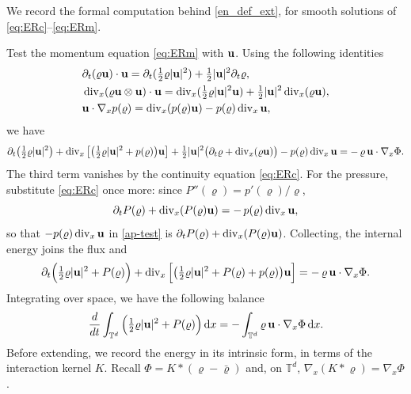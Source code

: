 \documentclass[12pt,a4paper,twoside]{article}
\newcommand{\vr}{\varrho}
\newcommand{\vu}{\vc{u}}
\newcommand{\vc}[1]{{\bf #1}}
\newcommand{\Grad}{\nabla}
\newcommand{\dx}{{\,\rm d} {x}}
\numberwithin{equation}{section}%
\newcommand{\Gradx}{\nabla_x}
\newcommand{\Divx}{\operatorname{div}_x}
\begin{document}
We record the formal computation behind \eqref{en_def_ext}, for smooth solutions of \eqref{eq:ERc}--\eqref{eq:ERm}. %

Test the momentum equation \eqref{eq:ERm} with $\vu$. 
Using the following identities 
\begin{align*}
	&\partial_t(\vr\vu)\cdot\vu = \partial_t(\tfrac12\vr|\vu|^2) + \tfrac12|\vu|^2\partial_t\vr,\\ 
	&\Divx(\vr\vu\otimes\vu)\cdot\vu = \Divx(\tfrac12\vr|\vu|^2\vu) + \tfrac12|\vu|^2\Divx(\vr\vu), \\
	&\vu\cdot\Gradx p(\vr)=\Divx(p(\vr)\vu)-p(\vr)\Divx\vu,
\end{align*}
we have
\begin{equation}\label{ap-test}
	\partial_t\big(\tfrac12\vr|\vu|^2\big)
	+ \Divx\big[\big(\tfrac12\vr|\vu|^2 + p(\vr)\big)\vu\big]
	+ \tfrac12|\vu|^2\big(\partial_t\vr + \Divx(\vr\vu)\big)
	- p(\vr)\Divx\vu
	= -\,\vr\,\vu\cdot\Gradx\Phi.
\end{equation}
The third term vanishes by the continuity equation \eqref{eq:ERc}. For the pressure, substitute \eqref{eq:ERc} once more: since $P''(\vr)=p'(\vr)/\vr$,
\begin{equation*}
	\partial_t P(\vr) + \Divx(P(\vr)\vu) = -\,p(\vr)\Divx\vu,
\end{equation*}
so that $-p(\vr)\Divx\vu$ in \eqref{ap-test} is $\partial_t P(\vr) + \Divx(P(\vr)\vu)$. Collecting, the internal energy joins the flux and
\begin{equation*}
	\partial_t\Big(\tfrac12\vr|\vu|^2 + P(\vr)\Big)
	+ \Divx\Big[\big(\tfrac12\vr|\vu|^2 + P(\vr) + p(\vr)\big)\vu\Big]
	= -\,\vr\,\vu\cdot\Gradx \Phi.
\end{equation*}
Integrating over space, we have the following balance
\begin{equation}\label{K-mech}
	\frac{d}{dt}\int_{\mathbb T^d}\Big(\tfrac12\vr|\vu|^2 + P(\vr)\Big) \dx
	= -\int_{\mathbb T^d}\vr\,\vu\cdot\Grad_x\Phi  \dx .
\end{equation}
Before extending, we record the energy in its intrinsic form, in terms of the interaction kernel $K$. Recall $\Phi=K\ast(\vr-\bar\vr)$ and, on $\mathbb T^d$, $\Grad_x(K\ast\vr)=\Grad_x\Phi$.
\end{document}
